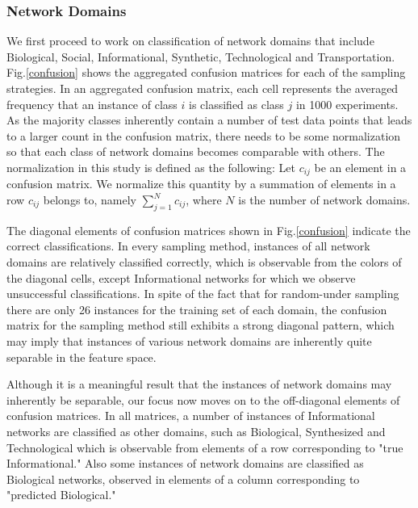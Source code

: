 \documentclass[..]{revtex4}
\begin{document}
 
\subsubsection{Network Domains} 
We first proceed to work on classification of network domains that include Biological, Social, Informational, Synthetic, Technological and Transportation. Fig.\ref{confusion} shows the aggregated confusion matrices for each of the sampling strategies. In an aggregated confusion matrix, each cell represents the averaged frequency that an instance of class $i$ is classified as class $j$ in 1000 experiments. As the majority classes inherently contain a number of test data points that leads to a larger count in the confusion matrix, there needs to be some normalization so that each class of network domains becomes comparable with others. The normalization in this study is defined as the following: Let $c_{ij}$ be an element in a confusion matrix. We normalize this quantity by a summation of elements in a row $c_{ij}$ belongs to, namely $\sum_{j=1}^N c_{ij}$, where $N$ is the number of network domains. 

The diagonal elements of confusion matrices shown in Fig.\ref{confusion} indicate the correct classifications. In every sampling method, instances of all network domains are relatively classified correctly, which is observable from the colors of the diagonal cells, except Informational networks for which we observe unsuccessful classifications. In spite of the fact that for random-under sampling there are only 26 instances for the training set of each domain, the confusion matrix for the sampling method still exhibits a strong diagonal pattern, which may imply that instances of various network domains are inherently quite separable in the feature space.

Although it is a meaningful result that the instances of network domains may inherently be separable, our focus now moves on to the off-diagonal elements of confusion matrices. In all matrices, a number of instances of Informational networks are classified as other domains, such as Biological, Synthesized and Technological which is observable from elements of a row corresponding to  "true Informational." Also some instances of network domains are classified as Biological networks, observed in elements of a column corresponding to "predicted Biological." 
\end{document}
